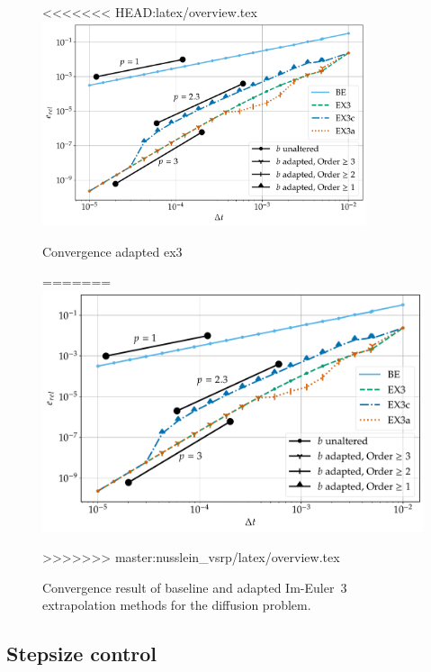 \documentclass[a4paper]{article}
\numberwithin{equation}{section}
\theoremstyle{plain}
\theoremstyle{definition}
\numberwithin{theorem}{section}
\newcommand{\1}{\mathbbm{1}}
\begin{document}
\begin{figure}[ht]
\centering
<<<<<<< HEAD:latex/overview.tex
\includegraphics[width=0.85\textwidth]{plots/conv_heat.pdf}
\caption{Convergence adapted ex3}
=======
\includegraphics[scale=0.75]{plots/conv_heat.pdf}
\caption{Convergence result of baseline and adapted Im-Euler~3
         extrapolation methods for the diffusion problem.}
>>>>>>> master:nusslein_vsrp/latex/overview.tex
\label{fig:conv_impl}
\end{figure}


\subsection{Stepsize control}
\end{document}
